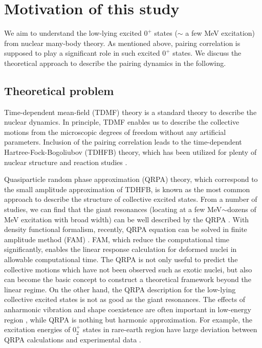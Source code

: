 \documentclass[11pt]{book} %
\begin{document}

\section{Motivation of this study}
We aim to understand the low-lying excited $0^+$ states ($\sim$ a few MeV excitation) from nuclear many-body theory. As mentioned above, pairing correlation is supposed to play a significant role in such excited $0^+$ states. We discuss the theoretical approach  to describe the pairing dynamics in the following.

\subsection{Theoretical problem}

Time-dependent mean-field (TDMF) theory is a standard theory to describe the nuclear dynamics. In principle, TDMF enables us to describe the collective motions from the microscopic degrees of freedom without any artificial parameters. Inclusion of the pairing correlation leads to the time-dependent Hartree-Fock-Bogoliubov (TDHFB) theory, which has been utilized for plenty of nuclear structure and reaction studies \cite{NMMY16}.

Quasiparticle random phase approximation (QRPA) theory, which correspond to the small amplitude approximation of TDHFB, is known as the most common approach to describe the structure of collective excited states. From a number of studies, we can find that the giant resonances (locating at a few MeV$\sim$dozens of MeV excitation with broad width) can be well described by the QRPA \cite{Eba10, YN11, YN13, SL13-2}. With density functional formalism, recently, QRPA equation can be solved in finite amplitude method (FAM) \cite{Na07}.  FAM, which reduce the computational time significantly, enables the linear response calculation for deformed nuclei in allowable computational time. 
The QRPA is not only useful to predict the collective motions which have not been observed such as exotic nuclei, but also can become the basic concept to construct a theoretical framework beyond the linear regime. On the other hand, the QRPA description for the low-lying collective excited states is not as good as the giant resonances. The effects of anharmonic vibration and shape coexistence are often important in low-energy region \cite{HW11}, while QRPA is nothing but harmonic approximation. For example, the excitation energies of $0_2^+$ states in rare-earth region have large deviation between QRPA calculations and experimental data \cite{TE11}. 
\end{document}
